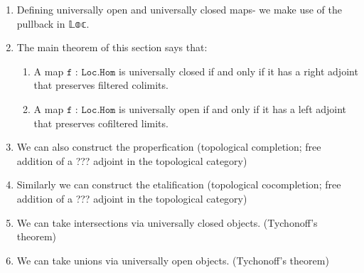 \documentclass{book}
\theoremstyle{definition}
\newcounter{lcounter}
\begin{document}
\begin{enumerate}
\item Defining universally open and universally closed maps- we make use of the pullback in 𝕃𝕠𝕔.
\item The main theorem of this section says that:
\begin{enumerate}
\item A map $\texttt{f : Loc.Hom}$ is universally closed if and only if it has a right adjoint that preserves filtered colimits.
\item A map $\texttt{f : Loc.Hom}$ is universally open if and only if it has a left adjoint that preserves cofiltered limits.
\end{enumerate} 
\item We can also construct the properfication (topological completion; free addition of a ??? adjoint in the topological category)
\item Similarly we can construct the etalification (topological cocompletion; free addition of a ??? adjoint in the topological category)
\item We can take intersections via universally closed objects. (Tychonoff's theorem)
\item We can take unions via universally open objects. (Tychonoff's theorem)
\end{enumerate}


\begin{center}
\begin{tcolorbox}[width=5in,colback={white},title={\begin{center}\texttt{Lean \thelcounter} \addtocounter{lcounter}{1}  \end{center}},colbacktitle=Blue,coltitle=black]
\begin{verbatim}

\end{verbatim}
\end{tcolorbox}
\end{center}

\begin{center}
\begin{tcolorbox}[width=5in,colback={white},title={\begin{center}\texttt{Lean \thelcounter} \addtocounter{lcounter}{1}  \end{center}},colbacktitle=Blue,coltitle=black]
\begin{verbatim}

\end{verbatim}
\end{tcolorbox}
\end{center}
\end{document}
